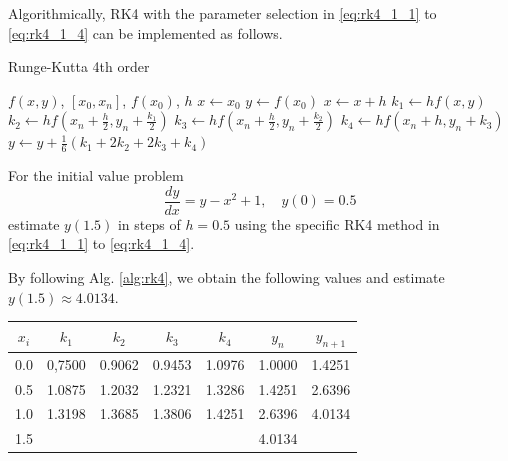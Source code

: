\documentclass[a4paper]{article}
\begin{document}
Algorithmically, RK4 with the  parameter selection in \eqref{eq:rk4_1_1} to \eqref{eq:rk4_1_4} can be implemented as follows.

\begin{algorithm}[H]
\caption{Runge-Kutta 4th order}
\begin{algorithmic}[1]
 {$f(x,y)$, $[x_0,x_n]$, $f(x_0)$, $h$}
\State $x\leftarrow x_0$
\State $y\leftarrow f(x_0)$
\State $x \leftarrow x + h$
\State $k_1 \leftarrow hf(x,y)$
\State $k_2 \leftarrow hf(x_n + \frac{h}{2}, y_n + \frac{k_1}{2}) $
\State $k_3 \leftarrow hf(x_n + \frac{h}{2}, y_n + \frac{k_2}{2})$
\State $k_4 \leftarrow hf(x_n +h, y_n + k_3)$
\State $y \leftarrow y + \frac{1}{6}\left(k_1 + 2k_2 + 2k_3 + k_4 \right)$ 
\EndWhile
\EndProcedure
\end{algorithmic}
\label{alg:rk4}
\end{algorithm}

\begin{exmp}
For the initial value problem
\[
\frac{dy}{dx} = y - x^2 + 1, \quad y(0) = 0.5
\]
estimate $y(1.5)$ in steps of $h=0.5$ using the specific RK4 method in \eqref{eq:rk4_1_1} to \eqref{eq:rk4_1_4}.
\end{exmp}

\begin{soln}
By following Alg. \ref{alg:rk4}, we obtain the following values and estimate $y(1.5) \approx 4.0134$.            
                
\begin{tabular}{SSSSSSS} \toprule
    {$x_i$} & {$k_1$} & {$k_2$} & {$k_3$} & {$k_4$} & {$y_n$} & {$y_{n+1}$} \\  & 0,7500 & 0.9062 & 0.9453 & 1.0976 & 1.0000 & 1.4251 \\
    0.5 & 1.0875 & 1.2032 & 1.2321 & 1.3286 & 1.4251 & 2.6396 \\
    1.0 & 1.3198 & 1.3685 & 1.3806 & 1.4251 & 2.6396 & 4.0134 \\
    1.5 &  &  &  &  & 4.0134 &  \\ \bottomrule
\end{tabular}                
\end{soln}

 
\end{document}
